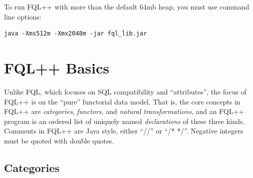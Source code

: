 \documentclass[12pt]{article}
\begin{document}
To run FQL++ with more than the default 64mb heap, you must use command line options:
\begin{verbatim}
java -Xms512m -Xmx2048m -jar fql_lib.jar
\end{verbatim}

\newpage

\section{FQL++ Basics}

Unlike FQL, which focuses on SQL compatibility and ``attributes'', the focus of FQL++ is on the ``pure'' functorial data model.  That is, the core concepts in FQL++ are {\it categories}, {\it functors}, and {\it natural transformations}, and an FQL++ program is an ordered list of uniquely named {\it declarations} of these three kinds.  Comments in FQL++ are Java style, either ``//'' or ``/* */''. Negative integers must be quoted with double quotes.

\subsection{Categories}
\end{document}
